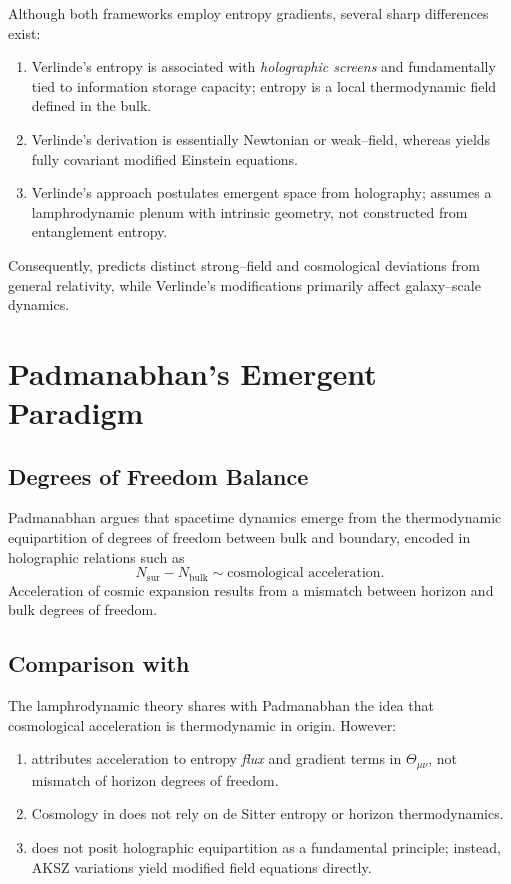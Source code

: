Although both frameworks employ entropy gradients, several sharp differences
exist:
\begin{enumerate}
\item Verlinde's entropy is associated with \emph{holographic screens} and
fundamentally tied to information storage capacity; \rsvpabbr{} entropy is a
local thermodynamic field defined in the bulk.
\item Verlinde's derivation is essentially Newtonian or weak--field, whereas
\rsvpabbr{} yields fully covariant modified Einstein equations.
\item Verlinde's approach postulates emergent space from holography;
\rsvpabbr{} assumes a lamphrodynamic plenum with intrinsic geometry, not
constructed from entanglement entropy.
\end{enumerate}

Consequently, \rsvpabbr{} predicts distinct strong--field and cosmological
deviations from general relativity, while Verlinde's modifications primarily
affect galaxy--scale dynamics.

\section{Padmanabhan's Emergent Paradigm}
\label{sec:padmanabhan}

\subsection{Degrees of Freedom Balance}
Padmanabhan argues that spacetime dynamics emerge from the thermodynamic
equipartition of degrees of freedom between bulk and boundary, encoded in
holographic relations such as
\[
  N_{\mathrm{sur}} - N_{\mathrm{bulk}} \sim \text{cosmological acceleration}.
\]
Acceleration of cosmic expansion results from a mismatch between horizon and
bulk degrees of freedom.

\subsection{Comparison with \rsvpabbr{}}

The lamphrodynamic theory shares with Padmanabhan the idea that cosmological
acceleration is thermodynamic in origin. However:
\begin{enumerate}
\item \rsvpabbr{} attributes acceleration to entropy \emph{flux} and gradient
terms in $\Theta_{\mu\nu}$, not mismatch of horizon degrees of freedom.
\item Cosmology in \rsvpabbr{} does not rely on de Sitter entropy or horizon
thermodynamics.
\item \rsvpabbr{} does not posit holographic equipartition as a fundamental
principle; instead, AKSZ variations yield modified field equations directly.
\end{enumerate}

